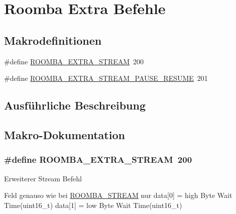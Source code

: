 \hypertarget{group__roomba__commands__extra}{\section{Roomba Extra Befehle}
\label{group__roomba__commands__extra}
}
\subsection*{Makrodefinitionen}
\begin{DoxyCompactItemize}
\item 
\#define \hyperlink{group__roomba__commands__extra_ga4df72d1f10ba6ced0986ce73225772f1}{R\-O\-O\-M\-B\-A\-\_\-\-E\-X\-T\-R\-A\-\_\-\-S\-T\-R\-E\-A\-M}~200
\item 
\#define \hyperlink{group__roomba__commands__extra_ga0bea168edae0eebe638d2aa678c3f6e2}{R\-O\-O\-M\-B\-A\-\_\-\-E\-X\-T\-R\-A\-\_\-\-S\-T\-R\-E\-A\-M\-\_\-\-P\-A\-U\-S\-E\-\_\-\-R\-E\-S\-U\-M\-E}~201
\end{DoxyCompactItemize}


\subsection{Ausführliche Beschreibung}


\subsection{Makro-\/\-Dokumentation}
\hypertarget{group__roomba__commands__extra_ga4df72d1f10ba6ced0986ce73225772f1}{
\subsubsection[{R\-O\-O\-M\-B\-A\-\_\-\-E\-X\-T\-R\-A\-\_\-\-S\-T\-R\-E\-A\-M}]{\setlength{\rightskip}{0pt plus 5cm}\#define R\-O\-O\-M\-B\-A\-\_\-\-E\-X\-T\-R\-A\-\_\-\-S\-T\-R\-E\-A\-M~200}}\label{group__roomba__commands__extra_ga4df72d1f10ba6ced0986ce73225772f1}
Erweiterer Stream Befehl

Feld genauso wie bei \hyperlink{group__roomba__commands__sensor_gafc6423e54083bd2b1abc99198bbbf739}{R\-O\-O\-M\-B\-A\-\_\-\-S\-T\-R\-E\-A\-M} nur data\mbox{[}0\mbox{]} = high Byte Wait Time(uint16\-\_\-t) data\mbox{[}1\mbox{]} = low Byte Wait Time(uint16\-\_\-t)

